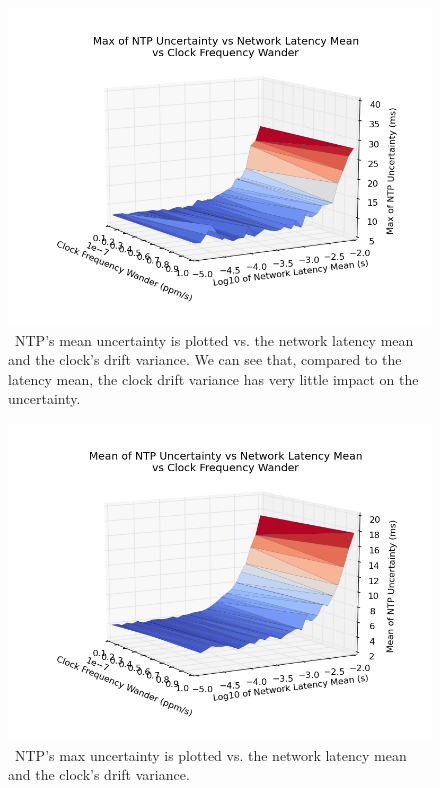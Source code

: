 \begin{figure}[t]
  \caption{~NTP's mean uncertainty is plotted vs. the network latency mean and the clock's drift variance. We can see that, compared to the latency mean, the clock drift variance has very little impact on the uncertainty.}
  \label{fig:max-uncertainty_latency-mean_drift-variance}
  \includegraphics[width=0.8\linewidth]{max_max_err-mean_latency-drift_variance.png}
\end{figure}

\begin{figure}[h]
  \caption{~NTP's max uncertainty is plotted vs. the network latency mean and the clock's drift variance.}
  \label{fig:mean-uncertainty_latency-mean_drift-variance}
  \includegraphics[width=0.8\linewidth]{mean_max_err-mean_latency-drift_variance.png}
\end{figure}


